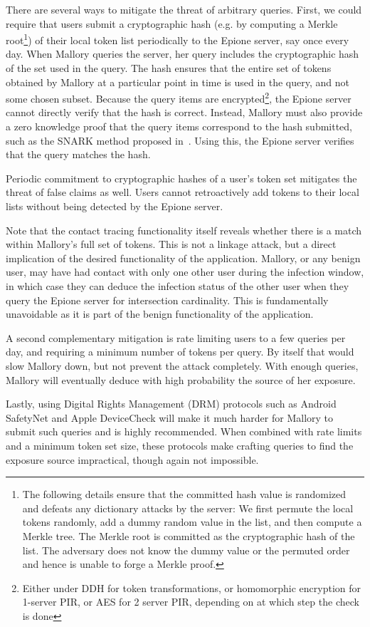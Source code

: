 \documentclass[11pt]{article} %
\newcommand{\dect}{\textsf{Epione}\xspace}
\begin{document}
{	There are several ways to mitigate the threat of arbitrary queries. First, 
	we could require that users submit a cryptographic hash (e.g. by computing a Merkle root\footnote{The following details ensure that the committed hash value is randomized and defeats any dictionary attacks by the server: We first permute the local tokens randomly, add a dummy random value in the list, and then compute a Merkle tree. The Merkle root is committed as the cryptographic hash of the list. The adversary does not know the dummy value or the permuted order and hence is unable to forge a Merkle proof.}) of their local token
	list periodically to the \dect server, say once every day.
	When Mallory queries the server, her query includes the cryptographic hash of the set used in the query. The hash ensures that the entire set of tokens obtained by Mallory at a particular point in time is used in the query, and not some chosen subset. Because the query items are encrypted\footnote{Either under DDH for token transformations, or homomorphic encryption for 1-server PIR, or AES for 2 server PIR, depending on at which step the check is done}, the \dect server cannot directly verify that the hash is correct. Instead, Mallory must also provide a zero knowledge proof that the query items correspond to the hash submitted, such as the SNARK method proposed in~\cite{USENIX:BCTV14}. Using this, the \dect server verifies that the query matches the hash.
	
	Periodic commitment to cryptographic hashes of a user's token set mitigates the threat of false claims as well. Users cannot retroactively add tokens to their local lists without being detected by the \dect server.
	
	Note that the contact tracing functionality itself reveals whether there is a match within Mallory's full set of tokens. This is not a linkage attack, but a direct implication of the desired functionality of the application. Mallory, or any benign user, may have had contact with only one other user during the infection window, in which case they can deduce the infection status of the other user when they query the \dect server for intersection cardinality. This is fundamentally unavoidable as it is part of the benign functionality of the application.
	
	A second complementary mitigation is rate limiting users to a few queries per day, and requiring a minimum number of tokens per query. By itself that would slow Mallory down, but not prevent the attack completely. With enough queries, Mallory will eventually deduce with high probability the source of her exposure.
	
	Lastly, using Digital Rights Management (DRM) protocols such as Android SafetyNet and Apple DeviceCheck will make it much harder for Mallory to submit such queries and is highly recommended. When combined with rate limits and a minimum token set size, these protocols make crafting queries to find the exposure source impractical, though again not impossible. 
}
\end{document}

